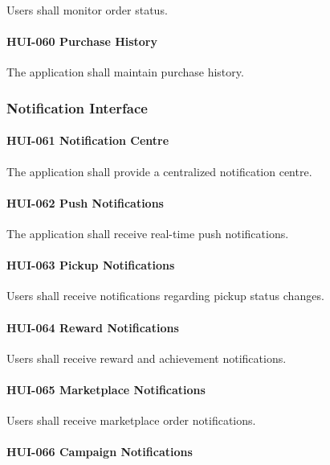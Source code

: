 Users shall monitor order status.

\paragraph{HUI-060 Purchase History}

The application shall maintain purchase history.


\subsubsection*{Notification Interface}

\paragraph{HUI-061 Notification Centre}

The application shall provide a centralized notification centre.

\paragraph{HUI-062 Push Notifications}

The application shall receive real-time push notifications.

\paragraph{HUI-063 Pickup Notifications}

Users shall receive notifications regarding pickup status changes.

\paragraph{HUI-064 Reward Notifications}

Users shall receive reward and achievement notifications.

\paragraph{HUI-065 Marketplace Notifications}

Users shall receive marketplace order notifications.

\paragraph{HUI-066 Campaign Notifications}

